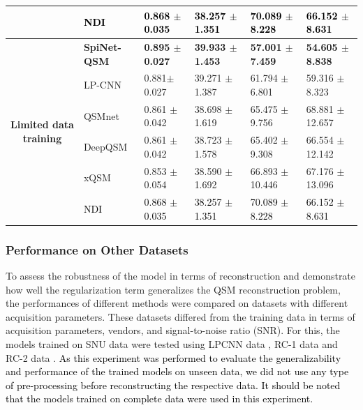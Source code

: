 \documentclass[sn-vancouver,Numbered]{sn-jnl}%
\begin{document}
\begin{table}[htbp]
{\begin{tabular}{clllll}
& \textcolor{black}{NDI}                
&\textcolor{black}{0.868 $\pm$ 0.035}
&\textcolor{black}{38.257 $\pm$ 1.351}  
&\textcolor{black}{70.089 $\pm$ 8.228}
&\textcolor{black}{66.152 $\pm$ 8.631}\\
\hline 
\multirow{6}{*}{\textbf{Limited data training}}        
& \textbf{SpiNet-QSM}   
&\textbf{0.895 $\pm$  0.027}     
&\textbf{39.933 $\pm$ 1.453 }	    
&\textbf{57.001 $\pm$ 7.459}	    
&\textbf{54.605 $\pm$ 8.838} \\ 
& LP-CNN                
&0.881$ \pm$ 0.027	            
&39.271 $\pm$ 1.387 	    
&61.794 $\pm$ 6.801	    
&59.316 $\pm$ 8.323 \\ 
& QSMnet                
&0.861 $\pm$ 0.042	            
&38.698 $\pm$ 1.619	    
&65.475 $\pm$ 9.756	    
&68.881 $\pm$ 12.657 \\ 
& DeepQSM               
&0.861 $\pm$ 0.042     	       
&38.723 $\pm$ 1.578        
&65.402 $\pm$ 9.308        
&66.554 $\pm$ 12.142 \\ 
& xQSM                
&0.853 $\pm$ 0.054     	       
&38.590 $\pm$ 1.692        
&66.893 $\pm$ 10.446        
&67.176 $\pm$ 13.096 \\ 
& \textcolor{black}{NDI}                
&\textcolor{black}{0.868 $\pm$ 0.035}
&\textcolor{black}{38.257 $\pm$ 1.351}  
&\textcolor{black}{70.089 $\pm$ 8.228}
&\textcolor{black}{66.152 $\pm$ 8.631}\\
\hline
\end{tabular} }
\label{tab:results_of_full_data_trained_models}
\end{table}


\subsubsection{Performance on Other Datasets}
To assess the robustness of the model in terms of reconstruction and demonstrate how well the regularization term generalizes the QSM reconstruction problem, the performances of different methods were compared on datasets with different acquisition parameters. These datasets differed from the training data in terms of acquisition parameters, vendors, and signal-to-noise ratio (SNR). For this, the models trained on SNU data were tested using LPCNN data \cite{lai2020learned}, RC-1 data \cite{langkammer2018quantitative} and RC-2 data \cite{marques2021qsm}. \textcolor{black}{ As this experiment was performed to evaluate the generalizability and performance of the trained models on unseen data, we did not use any type of pre-processing before reconstructing the respective data. It should be noted that the models trained on complete data were used in this experiment.}
\end{document}
